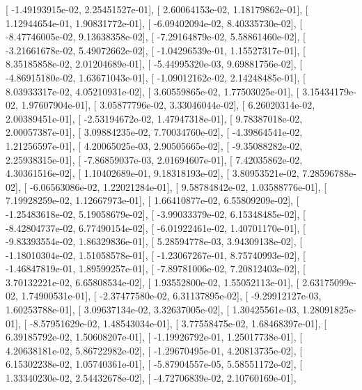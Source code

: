 \documentclass{article}
\begin{document}
       [ -1.49193915e-02,   2.25451527e-01],
       [  2.60064153e-02,   1.18179862e-01],
       [  1.12944654e-01,   1.90831772e-01],
       [ -6.09402094e-02,   8.40335730e-02],
       [ -8.47746005e-02,   9.13638358e-02],
       [ -7.29164879e-02,   5.58861460e-02],
       [ -3.21661678e-02,   5.49072662e-02],
       [ -1.04296539e-01,   1.15527317e-01],
       [  8.35185858e-02,   2.01204689e-01],
       [ -5.44995320e-03,   9.69881756e-02],
       [ -4.86915180e-02,   1.63671043e-01],
       [ -1.09012162e-02,   2.14248485e-01],
       [  8.03933317e-02,   4.05210931e-02],
       [  3.60559865e-02,   1.77503025e-01],
       [  3.15434179e-02,   1.97607904e-01],
       [  3.05877796e-02,   3.33046044e-02],
       [  6.26020314e-02,   2.00389451e-01],
       [ -2.53194672e-02,   1.47947318e-01],
       [  9.78387018e-02,   2.00057387e-01],
       [  3.09884235e-02,   7.70034760e-02],
       [ -4.39864541e-02,   1.21256597e-01],
       [  4.20065025e-03,   2.90505665e-02],
       [ -9.35088282e-02,   2.25938315e-01],
       [ -7.86859037e-03,   2.01694607e-01],
       [  7.42035862e-02,   4.30361516e-02],
       [  1.10402689e-01,   9.18318193e-02],
       [  3.80953521e-02,   7.28596788e-02],
       [ -6.06563086e-02,   1.22021284e-01],
       [  9.58784842e-02,   1.03588776e-01],
       [  7.19928259e-02,   1.12667973e-01],
       [  1.66410877e-02,   6.55809209e-02],
       [ -1.25483618e-02,   5.19058679e-02],
       [ -3.99033379e-02,   6.15348485e-02],
       [ -8.42804737e-02,   6.77490154e-02],
       [ -6.01922461e-02,   1.40701170e-01],
       [ -9.83393554e-02,   1.86329836e-01],
       [  5.28594778e-03,   3.94309138e-02],
       [ -1.18010304e-02,   1.51058578e-01],
       [ -1.23067267e-01,   8.75740993e-02],
       [ -1.46847819e-01,   1.89599257e-01],
       [ -7.89781006e-02,   7.20812403e-02],
       [  3.70132221e-02,   6.65808534e-02],
       [  1.93552800e-02,   1.55052113e-01],
       [  2.63175099e-02,   1.74900531e-01],
       [ -2.37477580e-02,   6.31137895e-02],
       [ -9.29912127e-03,   1.60253788e-01],
       [  3.09637134e-02,   3.32637005e-02],
       [  1.30425561e-03,   1.28091825e-01],
       [ -8.57951629e-02,   1.48543034e-01],
       [  3.77558475e-02,   1.68468397e-01],
       [  6.39185792e-02,   1.50608207e-01],
       [ -1.19926792e-01,   1.25017738e-01],
       [  4.20638181e-02,   5.86722982e-02],
       [ -1.29670495e-01,   4.20813735e-02],
       [  6.15302238e-02,   1.05740361e-01],
       [ -5.87904557e-05,   5.58551172e-02],
       [  1.33340230e-02,   2.54432678e-02],
       [ -4.72706839e-02,   2.10760169e-01],
\end{document}
